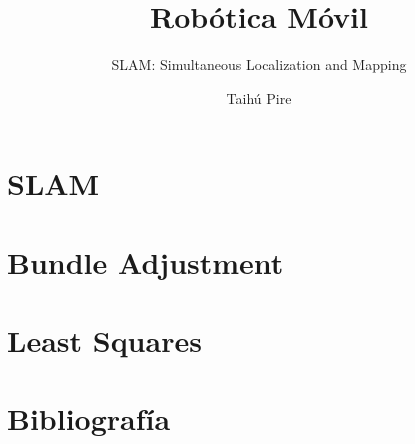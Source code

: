 \documentclass[aspectratio=169,compress]{beamer}
\subtitle{SLAM: Simultaneous Localization and Mapping}
\title{Robótica Móvil}
\author{Taihú Pire}
\institute{Laboratorio de Robótica}
\date{}
\begin{document}
	
	\frame{\titlepage}
	
	\section{SLAM}
	
    
    \section{Bundle Adjustment}
    
    
    
    \section{Least Squares}
    
	
	\section{Bibliografía}
	
	
\end{document}
